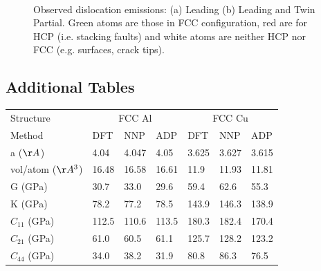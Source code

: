 \documentclass{article}
\begin{document}
\begin{figure}[H]%
\centering%
%
%
\\
\caption{Observed dislocation emissions: (a) Leading (b) Leading and Twin Partial.
Green atoms are those in FCC configuration, red are for HCP (i.e. stacking faults) and white atoms are neither HCP nor FCC (e.g. surfaces, crack tips).}
\label{fig:fracturedislocation_images}
\end{figure}




\subsection{Additional Tables}
\begin{tabular}{l|lll|lll}%
\hline%
Structure&\multicolumn{3}{c}{FCC Al}&\multicolumn{3}{c}{FCC Cu}\\%
Method&DFT&NNP&ADP&DFT&NNP&ADP\\%
\hline%
a ($\AA$)&4.04&4.047&4.05&3.625&3.627&3.615\\%
vol/atom ($\AA^3$)&16.48&16.58&16.61&11.9&11.93&11.81\\%
G (GPa)&30.7&33.0&29.6&59.4&62.6&55.3\\%
K (GPa)&78.2&77.2&78.5&143.9&146.3&138.9\\%
$C_{11}$ (GPa)&112.5&110.6&113.5&180.3&182.4&170.4\\%
$C_{21}$ (GPa)&61.0&60.5&61.1&125.7&128.2&123.2\\%
$C_{44}$ (GPa)&34.0&38.2&31.9&80.8&86.3&76.5\\%
\hline%
\end{tabular}%
\newline%
\newline%
\newline%
\newline%
\end{document}
